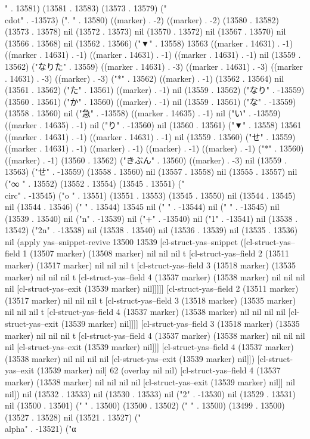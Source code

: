 {" . 13581) (13581 . 13583) (13573 . 13579) ("\\cdot" . -13573) (".
" . 13580) ((marker) . -2) ((marker) . -2) (13580 . 13582) (13573 . 13578) nil (13572 . 13573) nil (13570 . 13572) nil (13567 . 13570) nil (13566 . 13568) nil (13562 . 13566) ("▼" . 13558) 13563 ((marker . 14631) . -1) ((marker . 14631) . -1) ((marker . 14631) . -1) ((marker . 14631) . -1) nil (13559 . 13562) ("なりた" . 13559) ((marker . 14631) . -3) ((marker . 14631) . -3) ((marker . 14631) . -3) ((marker) . -3) ("*" . 13562) ((marker) . -1) (13562 . 13564) nil (13561 . 13562) ("た" . 13561) ((marker) . -1) nil (13559 . 13562) ("なり" . -13559) (13560 . 13561) ("か" . 13560) ((marker) . -1) nil (13559 . 13561) ("な" . -13559) (13558 . 13560) nil ("急" . -13558) ((marker . 14635) . -1) nil ("い" . -13559) ((marker . 14635) . -1) nil ("り" . -13560) nil (13560 . 13561) ("▼" . 13558) 13561 ((marker . 14631) . -1) ((marker . 14631) . -1) nil (13559 . 13560) ("せ" . 13559) ((marker . 14631) . -1) ((marker) . -1) ((marker) . -1) ((marker) . -1) ("*" . 13560) ((marker) . -1) (13560 . 13562) ("きぶん" . 13560) ((marker) . -3) nil (13559 . 13563) ("せ" . -13559) (13558 . 13560) nil (13557 . 13558) nil (13555 . 13557) nil ("∞
" . 13552) (13552 . 13554) (13545 . 13551) ("\\circ" . -13545) ("o
" . 13551) (13551 . 13553) (13545 . 13550) nil (13544 . 13545) nil (13544 . 13546) (" " . 13544) 13545 nil (" " . -13544) nil ("
" . -13545) nil (13539 . 13540) nil ("n" . -13539) nil ("+" . -13540) nil ("1" . -13541) nil (13538 . 13542) ("2n" . -13538) nil (13538 . 13540) nil (13536 . 13539) nil (13535 . 13536) nil (apply yas--snippet-revive 13500 13539 [cl-struct-yas--snippet ([cl-struct-yas--field 1 (13507 marker) (13508 marker) nil nil nil t [cl-struct-yas--field 2 (13511 marker) (13517 marker) nil nil nil t [cl-struct-yas--field 3 (13518 marker) (13535 marker) nil nil nil t [cl-struct-yas--field 4 (13537 marker) (13538 marker) nil nil nil nil [cl-struct-yas--exit (13539 marker) nil]]]]] [cl-struct-yas--field 2 (13511 marker) (13517 marker) nil nil nil t [cl-struct-yas--field 3 (13518 marker) (13535 marker) nil nil nil t [cl-struct-yas--field 4 (13537 marker) (13538 marker) nil nil nil nil [cl-struct-yas--exit (13539 marker) nil]]]] [cl-struct-yas--field 3 (13518 marker) (13535 marker) nil nil nil t [cl-struct-yas--field 4 (13537 marker) (13538 marker) nil nil nil nil [cl-struct-yas--exit (13539 marker) nil]]] [cl-struct-yas--field 4 (13537 marker) (13538 marker) nil nil nil nil [cl-struct-yas--exit (13539 marker) nil]]) [cl-struct-yas--exit (13539 marker) nil] 62 (overlay nil nil) [cl-struct-yas--field 4 (13537 marker) (13538 marker) nil nil nil nil [cl-struct-yas--exit (13539 marker) nil]] nil nil]) nil (13532 . 13533) nil (13530 . 13533) nil ("2" . -13530) nil (13529 . 13531) nil (13500 . 13501) ("  " . 13500) (13500 . 13502) (" " . 13500) (13499 . 13500) (13527 . 13528) nil (13521 . 13527) ("\\alpha" . -13521) ("α
}

